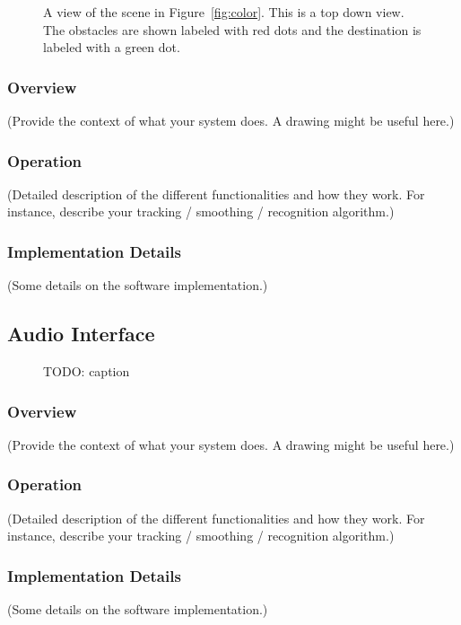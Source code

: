 \begin{figure}
\caption{A view of the scene in Figure~\ref{fig:color}. This is a top down view.
  The obstacles are shown labeled with red dots and the destination is labeled
  with a green dot.}
\label{fig:obstacle}
\end{figure}

\subsubsection{Overview}
\label{sec:obs-overview}

(Provide the context of what your system does. A drawing might be useful here.)

\subsubsection{Operation}
\label{sec:obs-op}

(Detailed description of the different functionalities and how they work. For
instance, describe your tracking / smoothing / recognition algorithm.)

\subsubsection{Implementation Details}
\label{sec:pbs-impl}

(Some details on the software implementation.)

\subsection{Audio Interface}
\label{sec:audio}

\begin{figure}
\caption{TODO: caption}
\label{fig:vsim}
\end{figure}

\subsubsection{Overview}
\label{sec:audio-overview}

(Provide the context of what your system does. A drawing might be useful here.)

\subsubsection{Operation}
\label{sec:audio-op}

(Detailed description of the different functionalities and how they work. For
instance, describe your tracking / smoothing / recognition algorithm.)

\subsubsection{Implementation Details}
\label{sec:audio-impl}

(Some details on the software implementation.)
